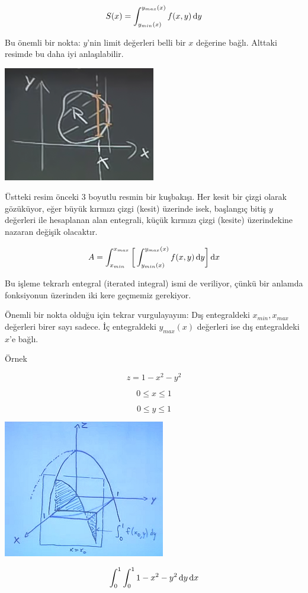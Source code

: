 \documentclass[12pt,fleqn]{article}\usepackage{../../common}
\begin{document}
$$ S(x) = \int_{y_{min}(x)}^{y_{max}(x)} f(x,y) \,\mathrm{d} y $$

Bu önemli bir nokta: $y$'nin limit değerleri belli bir $x$ değerine
bağlı. Alttaki resimde bu daha iyi anlaşılabilir.

\begin{center}
\includegraphics[height=5cm]{16_7.png}
\end{center}

Üstteki resim önceki 3 boyutlu resmin bir kuşbakışı. Her kesit bir çizgi olarak
gözüküyor, eğer büyük kırmızı çizgi (kesit) üzerinde isek, başlangıç bitiş $y$
değerleri ile hesaplanan alan entegrali, küçük kırmızı çizgi (kesite)
üzerindekine nazaran değişik olacaktır.

$$ A = \int_{x_{min}}^{x_{max}} 
\bigg[ 
\int_{y_{min}(x)}^{y_{max}(x)} f(x,y) \,\mathrm{d} y 
\bigg] \,\mathrm{d} x
$$

Bu işleme tekrarlı entegral (iterated integral) ismi de veriliyor, çünkü
bir anlamda fonksiyonun üzerinden iki kere geçmemiz gerekiyor. 


Önemli bir nokta olduğu için tekrar vurgulayayım: Dış entegraldeki
$x_{min}, x_{max}$ değerleri birer sayı sadece. İç entegraldeki
$y_{max}(x)$ değerleri ise dış entegraldeki $x$'e bağlı.

Örnek

$$ z = 1 - x^2 - y^2 $$

$$ 0 \le x \le 1 $$

$$ 0 \le y \le 1 $$
\begin{center}
\includegraphics[height=6cm]{16_8.png}
\end{center}
$$ \int_0^1 \int_0^1  1-x^2-y^2 \,\mathrm{d} y \,\mathrm{d} x $$
\end{document}
